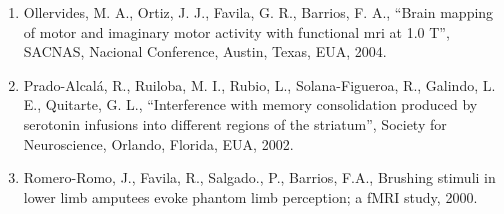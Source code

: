 \begin{enumerate}
\item Ollervides, M. A., Ortiz, J. J., Favila, G. R., Barrios, F. A., “Brain mapping of motor and imaginary motor activity 
with functional mri at 1.0 T”, SACNAS, Nacional Conference, Austin, Texas, EUA, 2004.

\item Prado-Alcalá, R., Ruiloba, M. I., Rubio, L., Solana-Figueroa, R., Galindo, L. E., Quitarte, G. L., “Interference with 
memory consolidation produced by serotonin infusions into different regions of the striatum”, Society for Neuroscience, Orlando, Florida, EUA, 
2002.

\item Romero-Romo, J., Favila, R., Salgado., P., Barrios, F.A., Brushing stimuli in lower limb amputees evoke phantom limb 
perception; a fMRI study, 2000.

\end{enumerate}

